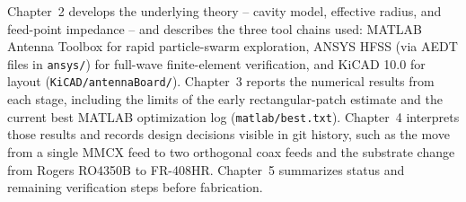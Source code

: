 Chapter~2 develops the underlying theory -- cavity model, effective radius, and feed-point impedance -- and describes the three tool chains used: MATLAB Antenna Toolbox for rapid particle-swarm exploration, ANSYS HFSS (via AEDT files in \texttt{ansys/}) for full-wave finite-element verification, and KiCAD 10.0 for layout (\texttt{KiCAD/antennaBoard/}). Chapter~3 reports the numerical results from each stage, including the limits of the early rectangular-patch estimate and the current best MATLAB optimization log (\texttt{matlab/best.txt}). Chapter~4 interprets those results and records design decisions visible in git history, such as the move from a single MMCX feed to two orthogonal coax feeds and the substrate change from Rogers RO4350B to FR-408HR. Chapter~5 summarizes status and remaining verification steps before fabrication.

